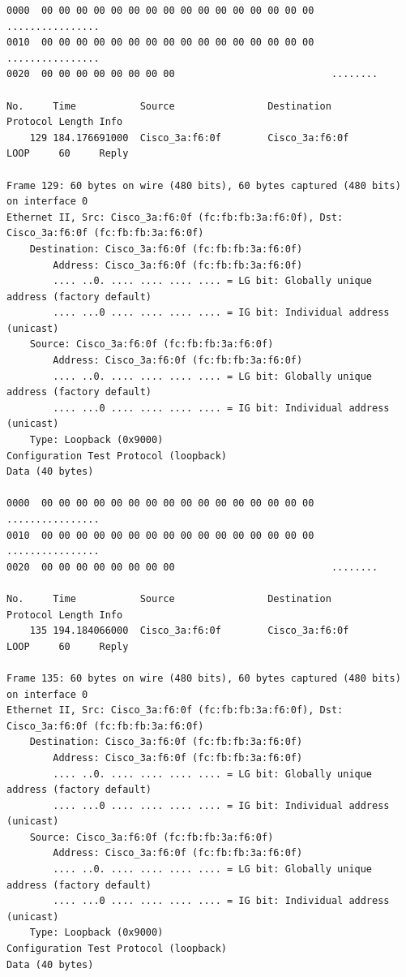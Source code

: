 \documentclass[a4paper,11pt]{article}
\begin{document}
\begin{lstlisting}
0000  00 00 00 00 00 00 00 00 00 00 00 00 00 00 00 00   ................
0010  00 00 00 00 00 00 00 00 00 00 00 00 00 00 00 00   ................
0020  00 00 00 00 00 00 00 00                           ........

No.     Time           Source                Destination           Protocol Length Info
    129 184.176691000  Cisco_3a:f6:0f        Cisco_3a:f6:0f        LOOP     60     Reply

Frame 129: 60 bytes on wire (480 bits), 60 bytes captured (480 bits) on interface 0
Ethernet II, Src: Cisco_3a:f6:0f (fc:fb:fb:3a:f6:0f), Dst: Cisco_3a:f6:0f (fc:fb:fb:3a:f6:0f)
    Destination: Cisco_3a:f6:0f (fc:fb:fb:3a:f6:0f)
        Address: Cisco_3a:f6:0f (fc:fb:fb:3a:f6:0f)
        .... ..0. .... .... .... .... = LG bit: Globally unique address (factory default)
        .... ...0 .... .... .... .... = IG bit: Individual address (unicast)
    Source: Cisco_3a:f6:0f (fc:fb:fb:3a:f6:0f)
        Address: Cisco_3a:f6:0f (fc:fb:fb:3a:f6:0f)
        .... ..0. .... .... .... .... = LG bit: Globally unique address (factory default)
        .... ...0 .... .... .... .... = IG bit: Individual address (unicast)
    Type: Loopback (0x9000)
Configuration Test Protocol (loopback)
Data (40 bytes)

0000  00 00 00 00 00 00 00 00 00 00 00 00 00 00 00 00   ................
0010  00 00 00 00 00 00 00 00 00 00 00 00 00 00 00 00   ................
0020  00 00 00 00 00 00 00 00                           ........

No.     Time           Source                Destination           Protocol Length Info
    135 194.184066000  Cisco_3a:f6:0f        Cisco_3a:f6:0f        LOOP     60     Reply

Frame 135: 60 bytes on wire (480 bits), 60 bytes captured (480 bits) on interface 0
Ethernet II, Src: Cisco_3a:f6:0f (fc:fb:fb:3a:f6:0f), Dst: Cisco_3a:f6:0f (fc:fb:fb:3a:f6:0f)
    Destination: Cisco_3a:f6:0f (fc:fb:fb:3a:f6:0f)
        Address: Cisco_3a:f6:0f (fc:fb:fb:3a:f6:0f)
        .... ..0. .... .... .... .... = LG bit: Globally unique address (factory default)
        .... ...0 .... .... .... .... = IG bit: Individual address (unicast)
    Source: Cisco_3a:f6:0f (fc:fb:fb:3a:f6:0f)
        Address: Cisco_3a:f6:0f (fc:fb:fb:3a:f6:0f)
        .... ..0. .... .... .... .... = LG bit: Globally unique address (factory default)
        .... ...0 .... .... .... .... = IG bit: Individual address (unicast)
    Type: Loopback (0x9000)
Configuration Test Protocol (loopback)
Data (40 bytes)


\end{lstlisting}
\end{document}
